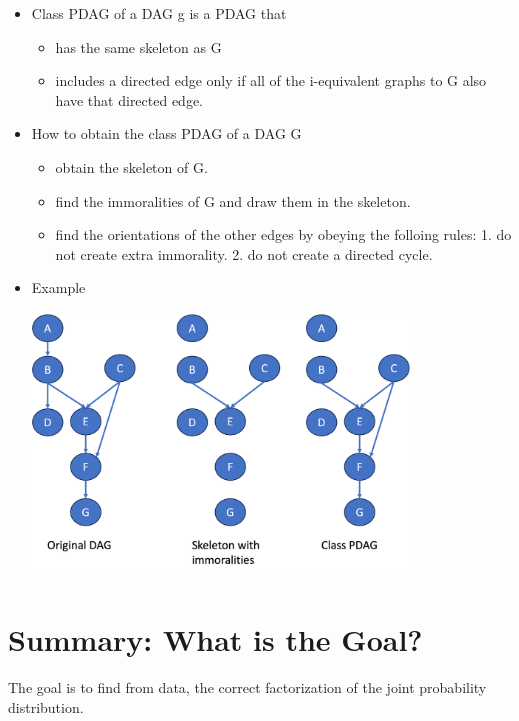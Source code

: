\documentclass[11pt,a4paper]{report}
\begin{document}
\begin{itemize}
    \item Class PDAG of a DAG g is a PDAG that

    \begin{itemize}
        \item has the same skeleton as G
        \item includes a directed edge only if all of the i-equivalent graphs to G also have that directed edge.
    \end{itemize}

\item How to obtain the class PDAG of a DAG G

    \begin{itemize}
        \item obtain the skeleton of G.
        \item find the immoralities of G and draw them in the skeleton.
        \item find the orientations of the other edges by obeying the folloing rules: 1. do not create extra immorality. 2. do not create a directed cycle.
    \end{itemize}

\item Example

\includegraphics[width = 10cm, height = 7cm]{pdag.png}

\end{itemize}

\section{Summary: What is the Goal?}

The goal is to find from data, the correct factorization of the joint probability distribution. 
\end{document}
